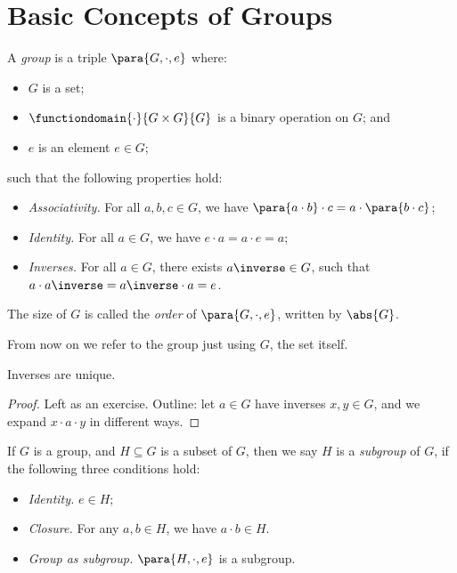 \section{Basic Concepts of Groups}

\begin{definition}[Group]
    \label{def:group}%
    A \emph{group} is a triple \(\para{G, \cdot, e}\) where:
    \begin{itemize}
        \item \(G\) is a set;
        \item \(\functiondomain{\cdot}{G \times G}{G}\) is a binary operation on \(G\); and
        \item \(e\) is an element \(e \in G\);
    \end{itemize}
    such that the following properties hold:
    \begin{itemize}
        \item \emph{Associativity.} For all \(a, b, c \in G\), we have \(\para{a \cdot b} \cdot c = a \cdot \para{b \cdot c}\);
        \item \emph{Identity.} For all \(a \in G\), we have \(e \cdot a = a \cdot e = a\);
        \item \emph{Inverses.} For all \(a \in G\), there exists \(a \inverse \in G\), such that \(a \cdot a \inverse = a \inverse \cdot a = e\).
    \end{itemize}

    The size of \(G\) is called the \emph{order} of \(\para{G, \cdot, e}\), written by \(\abs{G}\).
\end{definition}

From now on we refer to the group just using \(G\), the set itself.

\begin{proposition}
    \label{prop:inverses-unique}%
    Inverses are unique.
\end{proposition}

\begin{proof}
    Left as an exercise. Outline: let \(a \in G\) have inverses \(x, y \in G\), and we expand \(x \cdot a \cdot y\) in different ways.
\end{proof}

\begin{definition}[Subgroup]
    \label{def:subgroup}%
    If \(G\) is a group, and \(H \subseteq G\) is a subset of \(G\), then we say \(H\) is a \emph{subgroup} of \(G\), if the following three conditions hold:
    \begin{itemize}
        \item \emph{Identity.} \(e \in H\);
        \item \emph{Closure.} For any \(a, b \in H\), we have \(a \cdot b \in H\).
        \item \emph{Group as subgroup.} \(\para{H, \cdot, e}\) is a subgroup.
    \end{itemize}
\end{definition}

